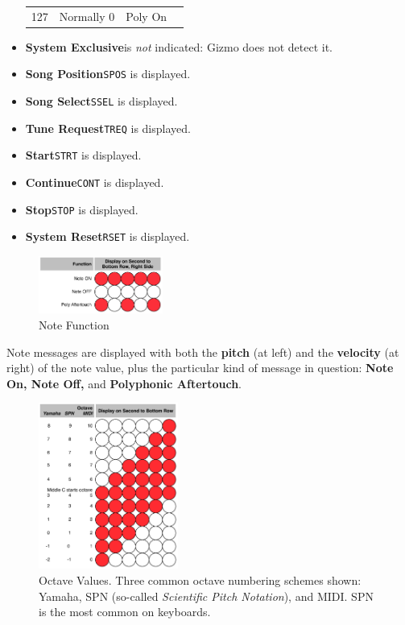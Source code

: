 \documentclass{article}
\begin{document}
\begin{itemize}
\begin{center}
\begin{tabular}{@{}rlll@{}}
127&Normally 0&Poly On\\
\end{tabular}\end{center}
\item {\bf System Exclusive}\quad is {\it not} indicated: Gizmo does not detect it.
\item {\bf Song Position}\quad \texttt{SPOS} is displayed.
\item {\bf Song Select}\quad \texttt{SSEL} is displayed.
\item {\bf Tune Request}\quad \texttt{TREQ} is displayed.
\item {\bf Start}\quad \texttt{STRT} is displayed.
\item {\bf Continue}\quad \texttt{CONT} is displayed.
\item {\bf Stop}\quad \texttt{STOP} is displayed.
\item {\bf System Reset}\quad \texttt{RSET} is displayed.
\end{itemize}


\begin{figure}
\vspace{-39em}\includegraphics[width=1.6in]{notefunction.pdf}
\vspace{-2em}\caption{\small Note Function}
\label{notefunction}
\end{figure}


Note messages are displayed with both the {\bf pitch} (at left) and the {\bf velocity} (at right) of the note value, plus the particular kind of message in question: {\bf Note On, Note Off,} and {\bf Polyphonic Aftertouch}.

\begin{figure}
\vspace{-32em}
\includegraphics[width=1.8in]{octave.pdf}
\vspace{-2em}\caption{\small Octave Values.  Three common octave numbering schemes shown: Yamaha, SPN (so-called {\it Scientific Pitch Notation}), and MIDI.  SPN is the most common on keyboards.}\vspace{-5em}
\label{octave}
\end{figure}
\end{document}
